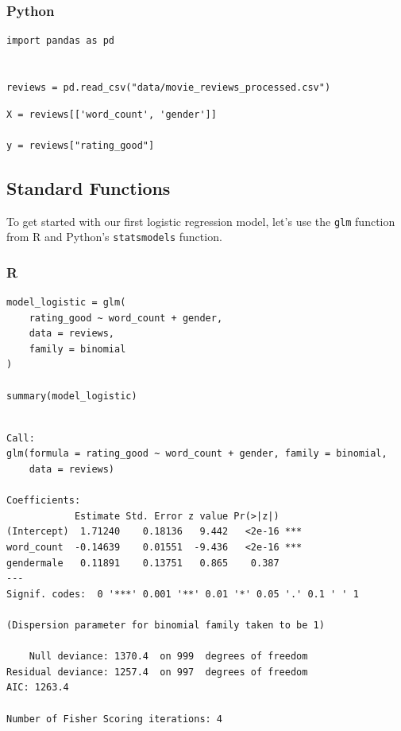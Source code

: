 \documentclass[
  letterpaper,
]{krantz}
\begin{document}
\subsubsection{Python}

\begin{verbatim}
import pandas as pd


reviews = pd.read_csv("data/movie_reviews_processed.csv")
\end{verbatim}

\begin{verbatim}
X = reviews[['word_count', 'gender']]

y = reviews["rating_good"]
\end{verbatim}

\subsection{Standard Functions}\label{sec-glm-binomial-standard}

To get started with our first logistic regression model, let's use the
\texttt{glm} function from R and Python's \texttt{statsmodels} function.

\subsubsection{R}

\begin{verbatim}
model_logistic = glm(
    rating_good ~ word_count + gender, 
    data = reviews,
    family = binomial
)

summary(model_logistic)
\end{verbatim}

\begin{verbatim}

Call:
glm(formula = rating_good ~ word_count + gender, family = binomial, 
    data = reviews)

Coefficients:
            Estimate Std. Error z value Pr(>|z|)    
(Intercept)  1.71240    0.18136   9.442   <2e-16 ***
word_count  -0.14639    0.01551  -9.436   <2e-16 ***
gendermale   0.11891    0.13751   0.865    0.387    
---
Signif. codes:  0 '***' 0.001 '**' 0.01 '*' 0.05 '.' 0.1 ' ' 1

(Dispersion parameter for binomial family taken to be 1)

    Null deviance: 1370.4  on 999  degrees of freedom
Residual deviance: 1257.4  on 997  degrees of freedom
AIC: 1263.4

Number of Fisher Scoring iterations: 4
\end{verbatim}
\end{document}
